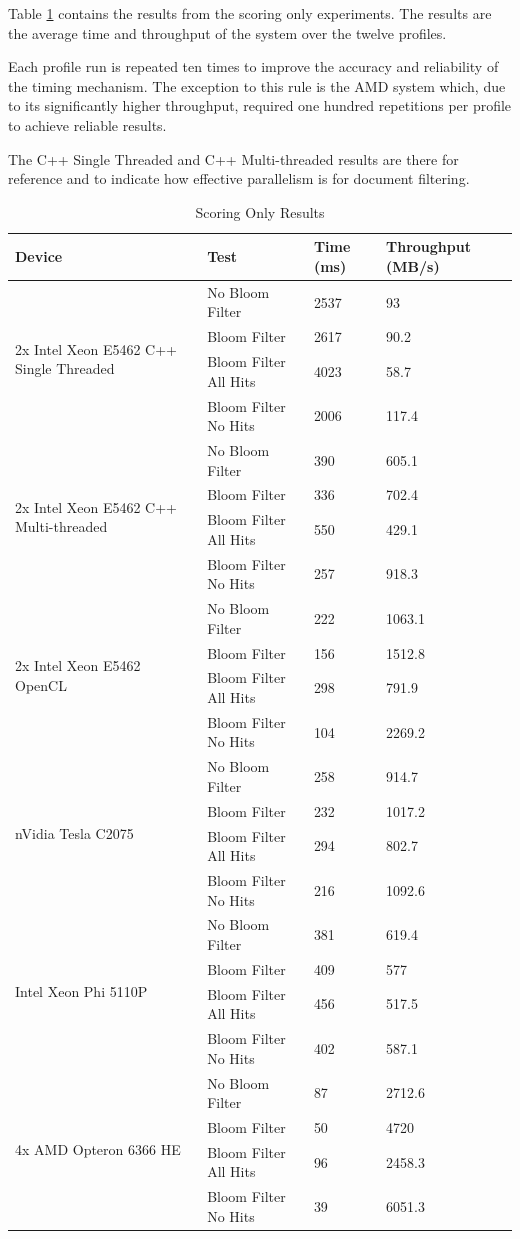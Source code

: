 Table \ref{table:scoringOnly} contains the results from the scoring only
experiments. The results are the average time and throughput of the system over
the twelve profiles.

Each profile run is repeated ten times to improve the accuracy and reliability
of the timing mechanism. The exception to this rule is the AMD system which,
due to its significantly higher throughput, required one hundred repetitions
per profile to achieve reliable results.

The C++ Single Threaded and C++ Multi-threaded results are there for reference
and to indicate how effective parallelism is for document filtering.

\begin{table}[H]
\begin{tabular}{|l|l|l|l|}
\hline
Device & Test & Time (ms) & Throughput (MB/s)\\
\hline
\multirow{4}{*}{2x Intel Xeon E5462 C++ Single Threaded}
& No Bloom Filter & 2537 & 93 \\
& Bloom Filter & 2617 & 90.2 \\
& Bloom Filter All Hits & 4023 & 58.7 \\
& Bloom Filter No Hits & 2006 & 117.4 \\
\hline
\multirow{4}{*}{2x Intel Xeon E5462 C++ Multi-threaded}
& No Bloom Filter & 390 & 605.1 \\
& Bloom Filter & 336 & 702.4 \\
& Bloom Filter All Hits & 550 & 429.1 \\
& Bloom Filter No Hits & 257 & 918.3 \\
\hline
\multirow{4}{*}{2x Intel Xeon E5462 OpenCL}
& No Bloom Filter & 222 & 1063.1 \\
& Bloom Filter & 156 & 1512.8 \\
& Bloom Filter All Hits & 298 & 791.9 \\
& Bloom Filter No Hits & 104 & 2269.2 \\
\hline
\multirow{4}{*}{nVidia Tesla C2075}
& No Bloom Filter & 258 & 914.7 \\
& Bloom Filter & 232 & 1017.2 \\
& Bloom Filter All Hits & 294 & 802.7 \\
& Bloom Filter No Hits & 216 & 1092.6 \\
\hline
\multirow{4}{*}{Intel Xeon Phi 5110P}
& No Bloom Filter & 381 & 619.4 \\
& Bloom Filter & 409 & 577 \\
& Bloom Filter All Hits & 456 & 517.5 \\
& Bloom Filter No Hits & 402 & 587.1 \\
\hline
\multirow{4}{*}{4x AMD Opteron 6366 HE}
& No Bloom Filter & 87 & 2712.6 \\
& Bloom Filter & 50 & 4720 \\
& Bloom Filter All Hits & 96 & 2458.3 \\
& Bloom Filter No Hits & 39 & 6051.3 \\
\hline
\end{tabular}
\caption{Scoring Only Results}
\label{table:scoringOnly}
\end{table}


